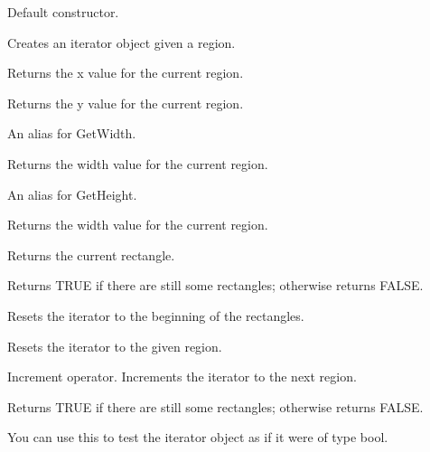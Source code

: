 
Default constructor.


Creates an iterator object given a region.



Returns the x value for the current region.



Returns the y value for the current region.



An alias for GetWidth.



Returns the width value for the current region.



An alias for GetHeight.



Returns the width value for the current region.



Returns the current rectangle.



Returns TRUE if there are still some rectangles; otherwise returns FALSE.



Resets the iterator to the beginning of the rectangles.


Resets the iterator to the given region.



Increment operator. Increments the iterator to the next region.



Returns TRUE if there are still some rectangles; otherwise returns FALSE.

You can use this to test the iterator object as if it were of type bool.

